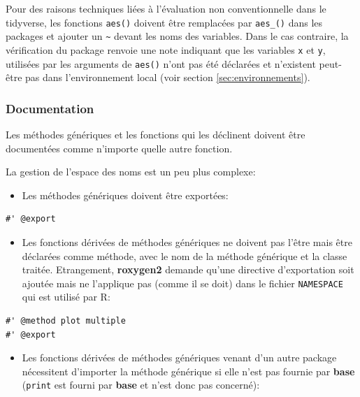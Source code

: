 \documentclass[
  12pt,
  french,
  a4paper,
  extrafontsizes,onecolumn,openright
  ]{memoir}
\providecommand{\tightlist}{%
  \setlength{\itemsep}{0pt}\setlength{\parskip}{0pt}}
\begin{document}
\normalsize

Pour des raisons techniques liées à l'évaluation non conventionnelle dans le tidyverse, les fonctions \texttt{aes()} doivent être remplacées par \texttt{aes\_()} dans les packages et ajouter un \texttt{\textasciitilde{}} devant les noms des variables.
Dans le cas contraire, la vérification du package renvoie une note indiquant que les variables \texttt{x} et \texttt{y}, utilisées par les arguments de \texttt{aes()} n'ont pas été déclarées et n'existent peut-être pas dans l'environnement local (voir section \ref{sec:environnements}).

\hypertarget{documentation}{%
\subsubsection{Documentation}\label{documentation}}

Les méthodes génériques et les fonctions qui les déclinent doivent être documentées comme n'importe quelle autre fonction.

La gestion de l'espace des noms est un peu plus complexe:

\begin{itemize}
\tightlist
\item
  Les méthodes génériques doivent être exportées:
\end{itemize}

\begin{verbatim}
#' @export
\end{verbatim}

\begin{itemize}
\tightlist
\item
  Les fonctions dérivées de méthodes génériques ne doivent pas l'être mais être déclarées comme méthode, avec le nom de la méthode générique et la classe traitée. Etrangement, \textbf{roxygen2} demande qu'une directive d'exportation soit ajoutée mais ne l'applique pas (comme il se doit) dans le fichier \texttt{NAMESPACE} qui est utilisé par R:
\end{itemize}

\begin{verbatim}
#' @method plot multiple
#' @export
\end{verbatim}

\begin{itemize}
\tightlist
\item
  Les fonctions dérivées de méthodes génériques venant d'un autre package nécessitent d'importer la méthode générique si elle n'est pas fournie par \textbf{base} (\texttt{print} est fourni par \textbf{base} et n'est donc pas concerné):
\end{itemize}
\end{document}
